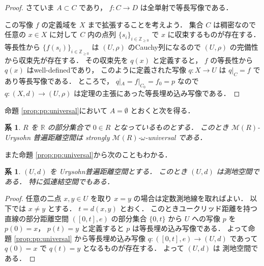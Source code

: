 \documentclass[leqno, 12pt]{jsarticle}
\newtheorem{cor}[thm]{系}
\newcommand{\zz}{\mathbb{Z}}
\newcommand{\yozz}[1]{\zz_{\ge #1}}
\newcommand{\rr}{\mathbb{R}}
\newcommand{\Met}[1]{\mathscr{M}(#1)}
\newcommand{\restr}[2]{#1|_{#2}}
\begin{document}
\begin{proof}
さていま
$A\subset C$
であり，
$f\colon  C\to D$
は全単射で等長写像である．



この写像
$f$
の定義域を
$X$
まで拡張することを考えよう．
集合
$C$
は稠密なので任意の
$x\in X$
に対して
$C$
内の点列
$\{s_{i}\}_{i\in \yozz{0}}$
で
$x$
に収束するものが存在する．
等長性から
$\{f(s_{i})\}_{i\in \yozz{0}}$
は
$(U, \rho)$
のCauchy列になるので
$(U, \rho)$
の完備性から収束先が存在する．
その収束先を
$q(x)$
と定義すると，
$f$%
の等長性から
$q(x)$
はwell-definedであり，
このように定義された写像
$q\colon  X\to U$
は
$\restr{q}{C}=f$
であり等長写像である．
ところで，
$\restr{q}{A}=\restr{f}{C_{0}}=f_{0}=p$
なので
$q\colon  (X, d)\to (U, \rho)$
は定理の主張にあった等長埋め込み写像である．
\end{proof}


命題 \ref{prop:pp:universal}において
$A=\emptyset$
とおくと次を得る．

\begin{cor}\label{cor:pp:omegauniversality}
$R$
を
$\rr$
の部分集合で
$0\in R$
となっているものとする．
このとき
$\Met{R}$-Urysohn
普遍距離空間は
strongly
$\Met{R}$-$\omega$-universal
である．
\end{cor}



また命題
\ref{prop:pp:universal}から次のこともわかる．

\begin{cor}\label{cor:pp:connected}
$(U, d)$%
を
Urysohn普遍距離空間とする．
このとき
$(U, d)$
は測地空間である．
特に弧連結空間でもある．
\end{cor}
\begin{proof}
任意の二点
$x, y\in U$
を取り
$x=y$
の場合は定数測地線を取ればよい．
以下では
$x\neq y$
とする．
$t=d(x, y)$
とおく．
このときユークリッド距離を持つ直線の部分距離空間
$([0, t], e)$
の部分集合
$\{0, t\}$
から
$U$
への写像
$p$
を
$p(0)=x$，
$p(t)=y$
と定義すると
$p$%
は等長埋め込み写像である．
よって命題
\ref{prop:pp:universal}
から等長埋め込み写像
$q\colon ([0, t], e)\to (U, d)$
であって
$q(0)=x$%
で
$q(t)=y$
となるものが存在する．
よって
$(U, d)$
は
測地空間である．
\end{proof}
\end{document}
